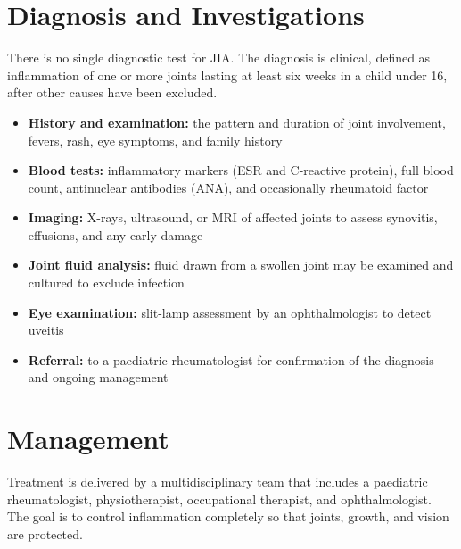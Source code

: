 \section*{Diagnosis and Investigations}
There is no single diagnostic test for JIA. The diagnosis is clinical, defined as inflammation of one or more joints lasting at least six weeks in a child under 16, after other causes have been excluded.

\begin{itemize}
    \item \textbf{History and examination:} the pattern and duration of joint involvement, fevers, rash, eye symptoms, and family history
    \item \textbf{Blood tests:} inflammatory markers (ESR and C-reactive protein), full blood count, antinuclear antibodies (ANA), and occasionally rheumatoid factor
    \item \textbf{Imaging:} X-rays, ultrasound, or MRI of affected joints to assess synovitis, effusions, and any early damage
    \item \textbf{Joint fluid analysis:} fluid drawn from a swollen joint may be examined and cultured to exclude infection
    \item \textbf{Eye examination:} slit-lamp assessment by an ophthalmologist to detect uveitis
    \item \textbf{Referral:} to a paediatric rheumatologist for confirmation of the diagnosis and ongoing management
\end{itemize}

\section*{Management}
Treatment is delivered by a multidisciplinary team that includes a paediatric rheumatologist, physiotherapist, occupational therapist, and ophthalmologist. The goal is to control inflammation completely so that joints, growth, and vision are protected.

